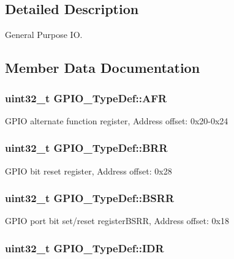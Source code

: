 \subsection{Detailed Description}
General Purpose I\-O. 

\subsection{Member Data Documentation}
\hypertarget{struct_g_p_i_o___type_def_af5b9bb2c6faec85580a3113de9af2fd0}{
\subsubsection[{A\-F\-R}]{ uint32\-\_\-t G\-P\-I\-O\-\_\-\-Type\-Def\-::\-A\-F\-R}}\label{struct_g_p_i_o___type_def_af5b9bb2c6faec85580a3113de9af2fd0}
G\-P\-I\-O alternate function register, Address offset\-: 0x20-\/0x24 \hypertarget{struct_g_p_i_o___type_def_aab918bfbfae459789db1fd0b220c7f21}{
\subsubsection[{B\-R\-R}]{ uint32\-\_\-t G\-P\-I\-O\-\_\-\-Type\-Def\-::\-B\-R\-R}}\label{struct_g_p_i_o___type_def_aab918bfbfae459789db1fd0b220c7f21}
G\-P\-I\-O bit reset register, Address offset\-: 0x28 \hypertarget{struct_g_p_i_o___type_def_acd6f21e08912b484c030ca8b18e11cd6}{
\subsubsection[{B\-S\-R\-R}]{ uint32\-\_\-t G\-P\-I\-O\-\_\-\-Type\-Def\-::\-B\-S\-R\-R}}\label{struct_g_p_i_o___type_def_acd6f21e08912b484c030ca8b18e11cd6}
G\-P\-I\-O port bit set/reset register\-B\-S\-R\-R, Address offset\-: 0x18 \hypertarget{struct_g_p_i_o___type_def_acf11156409414ad8841bb0b62959ee96}{
\subsubsection[{I\-D\-R}]{ uint32\-\_\-t G\-P\-I\-O\-\_\-\-Type\-Def\-::\-I\-D\-R}}\label{struct_g_p_i_o___type_def_acf11156409414ad8841bb0b62959ee96}
